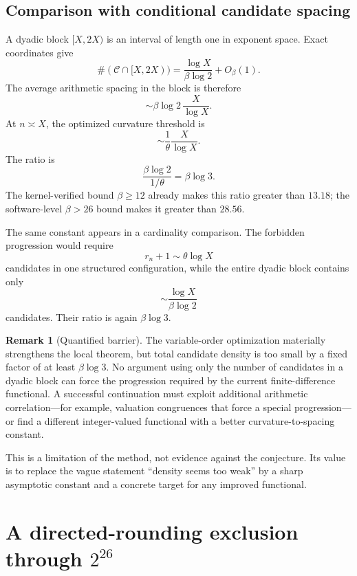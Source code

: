 \documentclass[11pt,oneside]{article}
\theoremstyle{definition}
\newtheorem{remark}[theorem]{Remark}
\newcommand{\Cand}{\mathcal C}
\begin{document}
\subsection{Comparison with conditional candidate spacing}

A dyadic block \([X,2X)\) is an interval of length one in exponent space.  Exact coordinates
give
\begin{equation}\label{eq:dyadic-count}
  \#(\Cand\cap[X,2X))
  =\frac{\log X}{\beta\log2}+O_\beta(1).
\end{equation}
The average arithmetic spacing in the block is therefore
\[
  \sim\beta\log2\,\frac{X}{\log X}.
\]
At \(n\asymp X\), the optimized curvature threshold is
\[
  \sim\frac1\theta\frac{X}{\log X}.
\]
The ratio is
\begin{equation}\label{eq:spacing-ratio}
  \frac{\beta\log2}{1/\theta}
  =\boxed{\beta\log3}.
\end{equation}
The kernel-verified bound \(\beta\ge12\) already makes this ratio greater than
\(13.18\); the software-level \(\beta>26\) bound makes it greater than \(28.56\).

The same constant appears in a cardinality comparison.  The forbidden progression would
require
\[
  r_n+1\sim\theta\log X
\]
candidates in one structured configuration, while the entire dyadic block contains only
\[
  \sim\frac{\log X}{\beta\log2}
\]
candidates.  Their ratio is again \(\beta\log3\).

\begin{remark}[Quantified barrier]\label{rem:difference-barrier}
The variable-order optimization materially strengthens the local theorem, but total
candidate density is too small by a fixed factor of at least \(\beta\log3\).  No argument
using only the number of candidates in a dyadic block can force the progression required
by the current finite-difference functional.  A successful continuation must exploit
additional arithmetic correlation---for example, valuation congruences that force a
special progression---or find a different integer-valued functional with a better
curvature-to-spacing constant.
\end{remark}

This is a limitation of the method, not evidence against the conjecture.  Its value is to
replace the vague statement ``density seems too weak'' by a sharp asymptotic constant and
a concrete target for any improved functional.

\section{A directed-rounding exclusion through \texorpdfstring{\(2^{26}\)}{2 to the 26}}\label{sec:computation}
\end{document}
